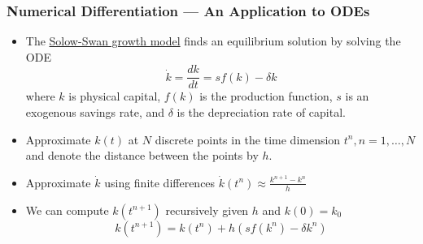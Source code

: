 \documentclass[11pt,xcolor={svgnames},aspectratio=169,usepdftitle=false]{beamer}
\begin{document}
\begin{frame}
  \frametitle{Numerical Differentiation --- An Application to ODEs}
\begin{itemize}
  \item The \href{https://en.wikipedia.org/wiki/Solow–Swan_model}{Solow-Swan growth model} finds an equilibrium solution by solving the ODE
  \begin{equation}
    \dot{k} = \frac{dk}{dt} = s f(k) - \delta k
    \label{eqn:solow_capital}
  \end{equation}
  where $k$ is physical capital, $f(k)$ is the production function, $s$ is an exogenous savings rate, and $\delta$ is the depreciation rate of capital.
  \item Approximate $k(t)$ at $N$ discrete points in the time dimension $t^n, n = 1,\ldots, N$ and denote the distance between the points by $h$.
  \item Approximate $\dot{k}$ using finite differences $\dot{k}(t^n) \approx \frac{k^{n+1} - k^n}{h}$
  \item We can compute $k(t^{n+1})$ recursively given $h$ and $k(0) = k_0$ 
  \[
  k(t^{n+1}) = k(t^{n}) + h \left(s f(k^n) - \delta k^n\right)
  \]
\end{itemize}
\end{frame}
\end{document}

